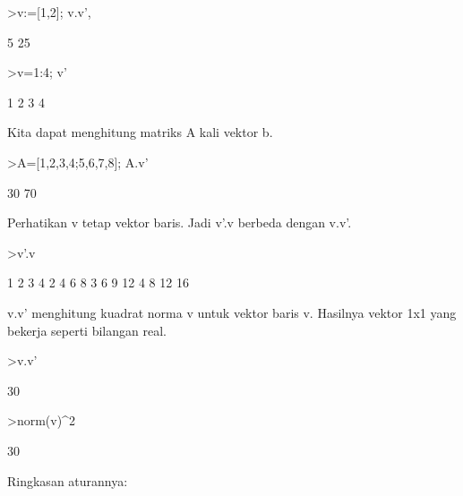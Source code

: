 \documentclass[a4paper,10pt]{article}
\begin{document}
\begin{eulernotebook}
\begin{eulercomment}
\begin{eulercomment}
\begin{eulercomment}
\begin{eulercomment}
\begin{eulercomment}
\begin{eulercomment}
\begin{eulercomment}
\begin{eulercomment}
\begin{eulercomment}
\begin{eulercomment}
\begin{eulercomment}
\begin{eulercomment}
\begin{eulercomment}
\begin{eulercomment}
\begin{eulercomment}
\begin{eulercomment}
\begin{eulerprompt}
>v:=[1,2]; v.v', %
\end{eulerprompt}
\begin{euleroutput}
  5
  25
\end{euleroutput}
\begin{eulerprompt}
>v=1:4; v'
\end{eulerprompt}
\begin{euleroutput}
              1 
              2 
              3 
              4 
\end{euleroutput}
\begin{eulercomment}
Kita dapat menghitung matriks A kali vektor b.
\end{eulercomment}
\begin{eulerprompt}
>A=[1,2,3,4;5,6,7,8]; A.v'
\end{eulerprompt}
\begin{euleroutput}
             30 
             70 
\end{euleroutput}
\begin{eulercomment}
Perhatikan v tetap vektor baris. Jadi v'.v berbeda dengan v.v'.
\end{eulercomment}
\begin{eulerprompt}
>v'.v
\end{eulerprompt}
\begin{euleroutput}
              1             2             3             4 
              2             4             6             8 
              3             6             9            12 
              4             8            12            16 
\end{euleroutput}
\begin{eulercomment}
v.v' menghitung kuadrat norma v untuk vektor baris v. Hasilnya vektor 1x1
yang bekerja seperti bilangan real.
\end{eulercomment}
\begin{eulerprompt}
>v.v'
\end{eulerprompt}
\begin{euleroutput}
  30
\end{euleroutput}
\begin{eulerprompt}
>norm(v)^2
\end{eulerprompt}
\begin{euleroutput}
  30
\end{euleroutput}
\begin{eulercomment}
Ringkasan aturannya:


\end{eulercomment}
\end{eulercomment}
\end{eulercomment}
\end{eulercomment}
\end{eulercomment}
\end{eulercomment}
\end{eulercomment}
\end{eulercomment}
\end{eulercomment}
\end{eulercomment}
\end{eulercomment}
\end{eulercomment}
\end{eulercomment}
\end{eulercomment}
\end{eulercomment}
\end{eulercomment}
\end{eulercomment}
\end{eulernotebook}
\end{document}
